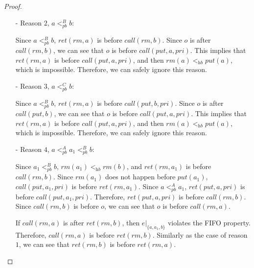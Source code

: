 \begin {proof}
\begin{itemize}
\item[-] Reason $2$, $a <_{\textit{pb}}^B b$:

    Since $a <_{\textit{pb}}^B b$, $\textit{ret}(\textit{rm},a)$ is before $\textit{call}(\textit{rm},b)$. Since $o$ is after $\textit{call}(\textit{rm},b)$, we can see that $o$ is before $\textit{call}(\textit{put},a,\textit{pri})$. This implies that $\textit{ret}(\textit{rm},a)$ is before $\textit{call}(\textit{put},a,\textit{pri})$, and then $\textit{rm}(a) <_{\textit{hb}} \textit{put}(a)$, which is impossible. Therefore, we can safely ignore this reason.

\item[-] Reason $3$, $a <_{\textit{pb}}^C b$:

    Since $a <_{\textit{pb}}^B b$, $\textit{ret}(\textit{rm},a)$ is before $\textit{call}(\textit{put},b,\textit{pri})$. Since $o$ is after $\textit{call}(\textit{put},b)$, we can see that $o$ is before $\textit{call}(\textit{put},a,\textit{pri})$. This implies that $\textit{ret}(\textit{rm},a)$ is before $\textit{call}(\textit{put},a,\textit{pri})$, and then $\textit{rm}(a) <_{\textit{hb}} \textit{put}(a)$, which is impossible. Therefore, we can safely ignore this reason.

\item[-] Reason $4$, $a <_{\textit{pb}}^A a_1 <_{\textit{pb}}^B b$:

    Since $a_1 <_{\textit{pb}}^B b$, $\textit{rm}(a_1) <_{\textit{hb}} \textit{rm}(b)$, and $\textit{ret}(\textit{rm},a_1)$ is before $\textit{call}(\textit{rm},b)$. Since $\textit{rm}(a_1)$ does not happen before $\textit{put}(a_1)$, $\textit{call}(\textit{put},a_1,\textit{pri})$ is before $\textit{ret}(\textit{rm},a_1)$. Since $a <_{\textit{pb}}^A a_1$, $\textit{ret}(\textit{put},a,\textit{pri})$ is before $\textit{call}(\textit{put},a_1,\textit{pri})$. Therefore, $\textit{ret}(\textit{put},a,\textit{pri})$ is before $\textit{call}(\textit{rm},b)$. Since $\textit{call}(\textit{rm},b)$ is before $o$, we can see that $o$ is before $\textit{call}(\textit{rm},a)$.

    If $\textit{call}(\textit{rm},a)$ is after $\textit{ret}(\textit{rm},b)$, then $e \vert_{ \{ a,a_1,b \} }$ violates the FIFO property. Therefore, $\textit{call}(\textit{rm},a)$ is before $\textit{ret}(\textit{rm},b)$. Similarly as the case of reason $1$, we can see that $\textit{ret}(\textit{rm},b)$ is before $\textit{ret}(\textit{rm},a)$.


\end{itemize}
\end{proof}
